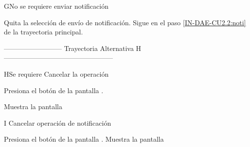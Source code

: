 
\begin{UCtrayectoriaA}{G}{No se requiere enviar notificación}
	
	\UCpaso [\UCactor] Quita la selección de envío de notificación.
	\UCpaso Sigue en el paso \ref{IN-DAE-CU2.2:noti}  de la trayectoria principal.
	
\end{UCtrayectoriaA}

-------------------------- Trayectoria Alternativa H———————————————— 
%
\begin{UCtrayectoriaA}{H}{Se requiere Cancelar la operación}
	
	\UCpaso [\UCactor] 	Presiona el botón  de la pantalla .
	
	\UCpaso Muestra la pantalla  
	
\end{UCtrayectoriaA}


\begin{UCtrayectoriaA}{I}{ Cancelar operación de notificación}
	
	\UCpaso [\UCactor] Presiona el botón  de la pantalla .
	\UCpaso Muestra la pantalla  
	
\end{UCtrayectoriaA}




